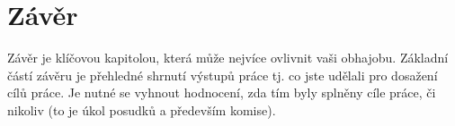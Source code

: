 \chapter{Závěr}

Závěr je klíčovou kapitolou, která může nejvíce ovlivnit vaši obhajobu. Základní částí závěru je přehledné shrnutí výstupů práce tj. co jste udělali pro dosažení cílů práce. Je nutné se vyhnout hodnocení, zda tím byly splněny cíle práce, či nikoliv (to je úkol posudků a především komise).
